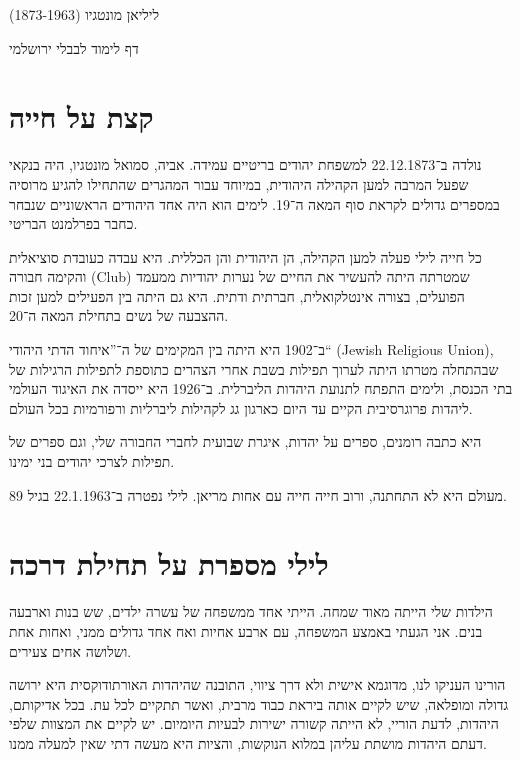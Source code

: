 \documentclass[14pt, article, extrafontsizes, twopage, a4paper]{memoir}
\begin{document}
{
  \centering
  \LARGE ליליאן מונטגיו (1873-1963)

  \Large דף לימוד לבבלי ירושלמי

}

\chapter{קצת על חייה}

נולדה ב־22.12.1873 למשפחת יהודים בריטיים עמידה. אביה, סמואל מונטגיו, היה בנקאי שפעל המרבה למען הקהילה היהודית, במיוחד עבור המהגרים שהתחילו להגיע מרוסיה במספרים גדולים לקראת סוף המאה ה־19. לימים הוא היה אחד היהודים הראשוניים שנבחר כחבר בפרלמנט הבריטי.


כל חייה לילי פעלה למען הקהילה, הן היהודית והן הכללית. היא עבדה כעובדת סוציאלית והקימה חבורה (\textenglish{Club}) שמטרתה היתה להעשיר את החיים של נערות יהודיות ממעמד הפועלים, בצורה אינטלקואלית, חברתית ודתית. היא גם היתה בין הפעילים למען זכות ההצבעה של נשים בתחילת המאה ה־20.

ב־1902 היא היתה בין המקימים של ה־”איחוד הדתי היהודי“ (\textenglish{Jewish Religious Union}), שבהתחלה מטרתו היתה לערוך תפילות בשבת אחרי הצהרים  כתוספת לתפילות הרגילות של בתי הכנסת, ולימים התפתח לתנועת היהדות הליברלית. ב־1926 היא ייסדה את האיגוד העולמי ליהדות פרוגרסיבית הקיים עד היום כארגון גג לקהילות ליברליות ורפורמיות בכל העולם.

היא כתבה רומנים, ספרים על יהדות, איגרת שבועית לחברי החבורה שלי, וגם ספרים של תפילות לצרכי יהודים בני ימינו.

מעולם היא לא התחתנה, ורוב חייה חייה עם אחות מריאן. לילי נפטרה ב־22.1.1963 בגיל 89.

\chapter{לילי מספרת על תחילת דרכה}

הילדות שלי הייתה מאוד שמחה. הייתי אחד ממשפחה של עשרה ילדים, שש בנות וארבעה בנים. אני הגעתי באמצע המשפחה, עם ארבע אחיות ואח אחד גדולים ממני, ואחות אחת ושלושה אחים צעירים.

הורינו העניקו לנו, מדוגמא אישית ולא דרך ציווי, התובנה שהיהדות האורתודוקסית היא ירושה גדולה ומופלאה, שיש לקיים אותה ביראת כבוד מרבית, ואשר תתקיים לכל עת. בכל אדיקותם, היהדות, לדעת הוריי, לא הייתה קשורה ישירות לבעיות היומיום. יש לקיים את המצוות שלפי דעתם היהדות מושתת עליהן במלוא הנוקשות, והציות היא מעשה דתי שאין למעלה ממנו.
\end{document}
